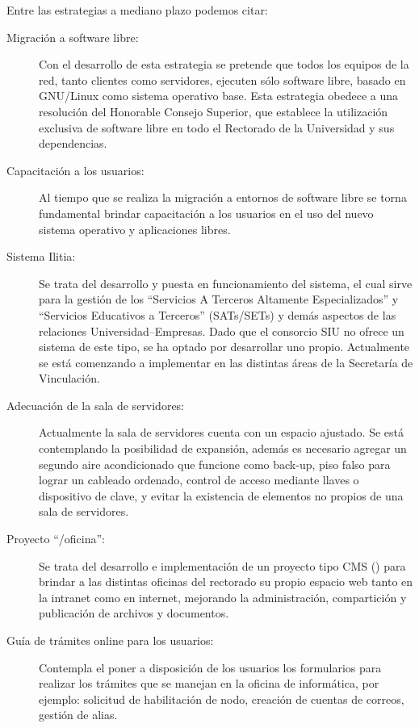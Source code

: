\documentclass[a4paper,11pt,oneside]{article}
\begin{document}
Entre las estrategias a mediano plazo podemos citar:
%
\begin{description}
\item[Migración a software libre:]
  Con el desarrollo de esta estrategia se pretende que todos los
  equipos de la red, tanto clientes como servidores, ejecuten sólo
  software libre, basado en GNU/Linux como sistema operativo base.
  Esta estrategia obedece a una resolución del Honorable Consejo
  Superior, que establece la utilización exclusiva de software libre
  en todo el Rectorado de la Universidad y sus dependencias.
%
\item[Capacitación a los usuarios:]
  Al tiempo que se realiza la migración a entornos de software libre
  se torna fundamental brindar capacitación a los usuarios en el uso
  del nuevo sistema operativo y aplicaciones libres.
%
\item[Sistema Ilitia:]
  Se trata del desarrollo y puesta en funcionamiento del sistema, el
  cual sirve para la gestión de los ``Servicios A Terceros Altamente
  Especializados'' y ``Servicios Educativos a Terceros'' (SATs/SETs) y
  demás aspectos de las relaciones Universidad--Empresas.  Dado que el
  consorcio SIU no ofrece un sistema de este tipo, se ha optado por
  desarrollar uno propio.  Actualmente se está comenzando a
  implementar en las distintas áreas de la Secretaría de Vinculación.
%
\item[Adecuación de la sala de servidores:]
  Actualmente la sala de servidores cuenta con un espacio ajustado.
  Se está contemplando la posibilidad de expansión, además es
  necesario agregar un segundo aire acondicionado que funcione como
  back-up, piso falso para lograr un cableado ordenado, control de
  acceso mediante llaves o dispositivo de clave, y evitar la
  existencia de elementos no propios de una sala de servidores.
%
\item[Proyecto ``/oficina'':]
  Se trata del desarrollo e implementación de un proyecto tipo CMS
  () para brindar a las distintas
  oficinas del rectorado su propio espacio web tanto en la intranet
  como en internet, mejorando la administración, compartición y
  publicación de archivos y documentos.
%
\item [Guía de trámites online para los usuarios:]
  Contempla el poner a disposición de los usuarios los formularios
  para realizar los trámites que se manejan en la oficina de
  informática, por ejemplo: solicitud de habilitación de nodo,
  creación de cuentas de correos, gestión de alias.
\end{description}
\end{document}
